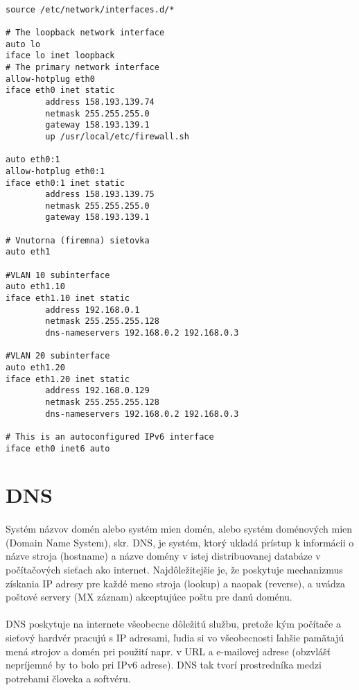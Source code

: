 \noindent
{\selectfont

\begin{small}

\begin{verbatim}

source /etc/network/interfaces.d/*

# The loopback network interface
auto lo
iface lo inet loopback
# The primary network interface
allow-hotplug eth0
iface eth0 inet static
        address 158.193.139.74
        netmask 255.255.255.0
        gateway 158.193.139.1
        up /usr/local/etc/firewall.sh

auto eth0:1
allow-hotplug eth0:1
iface eth0:1 inet static
        address 158.193.139.75
        netmask 255.255.255.0
        gateway 158.193.139.1

# Vnutorna (firemna) sietovka
auto eth1

#VLAN 10 subinterface
auto eth1.10
iface eth1.10 inet static
        address 192.168.0.1
        netmask 255.255.255.128
        dns-nameservers 192.168.0.2 192.168.0.3

#VLAN 20 subinterface
auto eth1.20
iface eth1.20 inet static
        address 192.168.0.129
        netmask 255.255.255.128
        dns-nameservers 192.168.0.2 192.168.0.3

# This is an autoconfigured IPv6 interface
iface eth0 inet6 auto

\end{verbatim}
\end{small}
}



\section{DNS}
\paragraph{}
Systém názvov domén alebo systém mien domén, alebo systém doménových mien (Domain Name System), skr. DNS, je systém, ktorý ukladá prístup k informácii o názve stroja (hostname) a názve domény v istej distribuovanej databáze v počítačo\-vých sieťach ako internet. Najdôležitejšie je, že poskytuje mechanizmus získania IP adresy pre každé meno stroja (lookup) a naopak (reverse), a uvádza poštové servery (MX záznam) akceptujúce poštu pre danú doménu.
\paragraph{}
DNS poskytuje na internete všeobecne dôležitú službu, pretože kým počítače a sieťový hardvér pracujú s IP adresami, ľudia si vo všeobecnosti ľahšie pamätajú mená strojov a domén pri použití napr. v URL a e-mailovej adrese (obzvlášť nepríjem\-né by to bolo pri IPv6 adrese). DNS tak tvorí prostredníka medzi potrebami človeka a softvéru.
